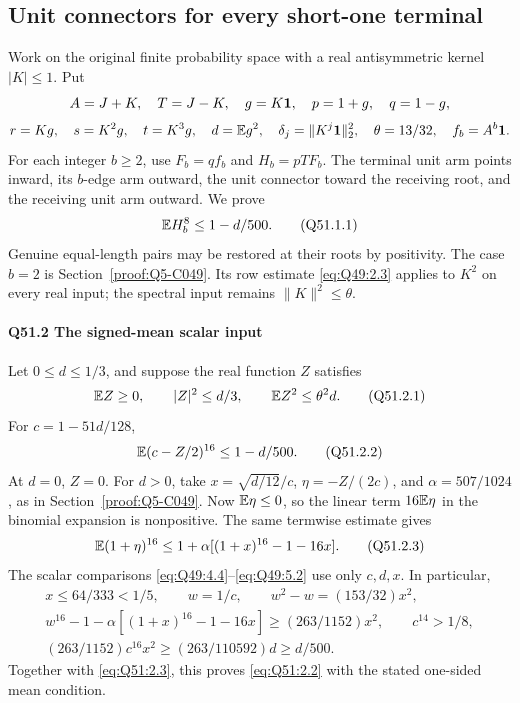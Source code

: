 \subsection{Unit connectors for every short-one terminal}\label{proof:Q5-C051}
Work on the original finite probability space with a real antisymmetric kernel \(|K|\le\allowbreak 1\). Put
\[
A=J+K,\quad T=J-K,\quad g=K\mathbf1,\quad p=1+g,\quad q=1-g,
\]
\[
r=Kg,\quad s=K^2g,\quad t=K^3g,\quad
d=\mathbb E g^2,\quad \delta_j=\|K^j\mathbf1\|_2^2,\quad
\theta=13/32,\quad f_b=A^b\mathbf1.
\]
For each integer \(b\ge\allowbreak 2\), use
\(F_b=\allowbreak qf_b\) and \(H_b=\allowbreak pTF_b\).
The terminal unit arm points inward, its \(b\)-edge arm outward, the unit connector toward the receiving root, and the receiving unit arm outward. We prove
\[
\mathbb E H_b^8\le1-d/500.
\tag{Q51.1.1}\label{eq:Q51:1.1}
\]
Genuine equal-length pairs may be restored at their roots by positivity.
The case \(b=\allowbreak 2\) is Section~\ref{proof:Q5-C049}. Its row estimate \eqref{eq:Q49:2.3} applies to \(K^2\) on every real input; the spectral input remains \(\|K\|^2\le\allowbreak \theta\).

\paragraph{Q51.2 The signed-mean scalar input}
Let \(0\le\allowbreak  d\le\allowbreak 1/3\), and suppose the real function \(Z\) satisfies
\[
\mathbb E Z\ge0,\qquad |Z|^2\le d/3,\qquad \mathbb E Z^2\le\theta^2d.
\tag{Q51.2.1}\label{eq:Q51:2.1}
\]
For \(c=\allowbreak 1-51d/128\),
\[
\mathbb E(c-Z/2)^{16}\le1-d/500.
\tag{Q51.2.2}\label{eq:Q51:2.2}
\]
At \(d=\allowbreak 0\), \(Z=\allowbreak 0\). For \(d>\allowbreak 0\), take
\(x=\allowbreak \sqrt{d/12}/c\), \(\eta=\allowbreak -Z/(2c)\), and \(\alpha=\allowbreak 507/1024\), as in Section~\ref{proof:Q5-C049}.
Now \(\mathbb E\eta\le\allowbreak 0\), so the linear term \(16\mathbb E\eta\) in the binomial expansion is nonpositive. The same termwise estimate gives
\[
\mathbb E(1+\eta)^{16}
\le1+\alpha[(1+x)^{16}-1-16x].
\tag{Q51.2.3}\label{eq:Q51:2.3}
\]
The scalar comparisons \eqref{eq:Q49:4.4}--\eqref{eq:Q49:5.2} use only \(c,\allowbreak d,\allowbreak x\). In particular,
\[
\begin{gathered}
x\le64/333<1/5,\qquad w=1/c,\qquad w^2-w=(153/32)x^2,\\
w^{16}-1-\alpha[(1+x)^{16}-1-16x]\ge(263/1152)x^2,\qquad c^{14}>1/8,\\
(263/1152)c^{16}x^2\ge(263/110592)d\ge d/500.
\end{gathered}
\]
Together with \eqref{eq:Q51:2.3}, this proves \eqref{eq:Q51:2.2} with the stated one-sided mean condition.

